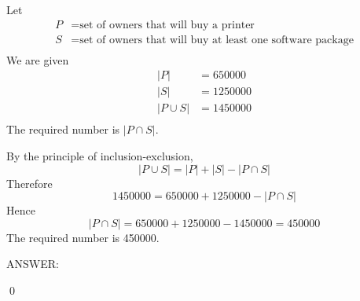Let
\begin{align*}
P &= \text{set of owners that will buy a printer} \\
S &= \text{set of owners that will buy at least one software package} \\
\end{align*}
We are given
\begin{align*}
|P| &= 650000 \\
|S| &= 1250000 \\
|P \cup S| &= 1450000\\
\end{align*}
The required number is $|P \cap S|$.

By the principle of inclusion-exclusion, 
\[
|P \cup S| = |P| + |S| - |P \cap S|
\]
Therefore
\[
1450000 = 650000 + 1250000 - |P \cap S|
\]
Hence
\[
|P \cap S| = 650000 + 1250000 - 1450000 = 450000  
\]
The required number is 450000.

ANSWER:

\qed
